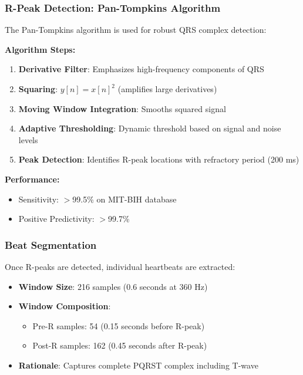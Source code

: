 \documentclass[12pt,a4paper]{article}
\begin{document}
\subsubsection{R-Peak Detection: Pan-Tompkins Algorithm}

The Pan-Tompkins algorithm is used for robust QRS complex detection:

\textbf{Algorithm Steps:}
\begin{enumerate}
    \item \textbf{Derivative Filter}: Emphasizes high-frequency components of QRS
    \item \textbf{Squaring}: $y[n] = x[n]^2$ (amplifies large derivatives)
    \item \textbf{Moving Window Integration}: Smooths squared signal
    \item \textbf{Adaptive Thresholding}: Dynamic threshold based on signal and noise levels
    \item \textbf{Peak Detection}: Identifies R-peak locations with refractory period (200 ms)
\end{enumerate}

\textbf{Performance:}
\begin{itemize}
    \item Sensitivity: $>$99.5\% on MIT-BIH database
    \item Positive Predictivity: $>$99.7\%
\end{itemize}

\subsubsection{Beat Segmentation}

Once R-peaks are detected, individual heartbeats are extracted:

\begin{itemize}
    \item \textbf{Window Size}: 216 samples (0.6 seconds at 360 Hz)
    \item \textbf{Window Composition}:
    \begin{itemize}
        \item Pre-R samples: 54 (0.15 seconds before R-peak)
        \item Post-R samples: 162 (0.45 seconds after R-peak)
    \end{itemize}
    \item \textbf{Rationale}: Captures complete PQRST complex including T-wave
\end{itemize}
\end{document}
